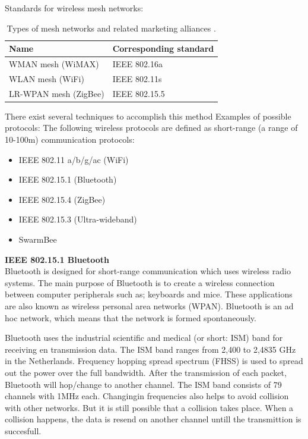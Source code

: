 \documentclass[10pt,a4paper]{article}
\begin{document}
Standards for wireless mesh networks:\cite{emergingstandarsforwirelessmeshtechnology}

\begin{table}[H]
\centering
\caption{Types of mesh networks and related marketing alliances \cite{emergingstandarsforwirelessmeshtechnology}.}
\label{meshstandard}
\begin{tabular}{|l|l|}
    \hline
    \textbf{Name}         & \textbf{Corresponding standard} \\ \hline
    WMAN mesh (WiMAX)     & IEEE 802.16a                    \\ \hline
    WLAN mesh (WiFi)      & IEEE 802.11s                    \\ \hline
    LR-WPAN mesh (ZigBee) & IEEE 802.15.5                   \\ \hline
\end{tabular}
\end{table}



There exist several techniques to accomplish this method 
Examples of possible protocols:
The following wireless protocols are defined as short-range (a range of 10-100m) communication protocols:
\begin{itemize}
\setlength\itemsep{0em}
    \item IEEE 802.11 a/b/g/ac (WiFi) \cite{IEEE80211timeline}
    \item IEEE 802.15.1 (Bluetooth)
    \item IEEE 802.15.4 (ZigBee)
    \item IEEE 802.15.3 (Ultra-wideband)
    \item SwarmBee
\end{itemize}

\textbf{IEEE 802.15.1 Bluetooth}\\
Bluetooth is designed for short-range communication which uses wireless radio systems. The main purpose of Bluetooth is to create a wireless connection between computer peripherals such as; keyboards and mice. These applications are also known as wireless personal area networks (WPAN). \cite{comparitivestudywirelessprotocols} Bluetooth is an ad hoc network, which means that the network is formed spontaneously.\cite{tcipbook}

Bluetooth uses the industrial scientific and medical (or short: ISM) band for receiving en transmission data. The ISM band ranges from 2,400 to 2,4835 GHz in the Netherlands. \cite{frequencyandsnetherlands} Frequency hopping spread spectrum (FHSS) is used to spread out the power over the full bandwidth. After the transmission of each packet, Bluetooth will hop/change to another channel. The ISM band consists of 79 channels with 1MHz each. Changingin frequencies also helps to avoid collision with other networks. But it is still possible that a collision takes place. When a collision happens, the data is resend on another channel untill the transmittion is succesfull.
\end{document}
